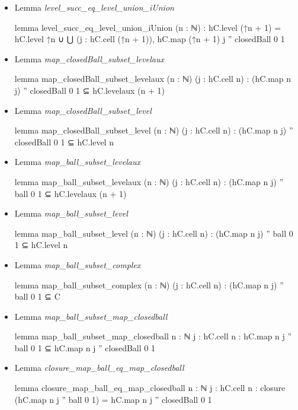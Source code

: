 \documentclass[colorinlistoftodos]{article}
\begin{document}
\begin{itemize}
\begin{leancode}
\end{leancode}
  \item Lemma \emph{level\_succ\_eq\_level\_union\_iUnion}
\begin{leancode}
lemma level_succ_eq_level_union_iUnion (n : ℕ) : 
  hC.level (↑n + 1) = 
  hC.level ↑n ∪ ⋃ (j : hC.cell (↑n + 1)), hC.map (↑n + 1) j '' closedBall 0 1
\end{leancode}
  \item Lemma \emph{map\_closedBall\_subset\_levelaux}
\begin{leancode}
lemma map_closedBall_subset_levelaux (n : ℕ) (j : hC.cell n) : 
  (hC.map n j) '' closedBall 0 1 ⊆ hC.levelaux (n + 1)
\end{leancode}
  \item Lemma \emph{map\_closedBall\_subset\_level}
\begin{leancode}
lemma map_closedBall_subset_level (n : ℕ) (j : hC.cell n) : 
  (hC.map n j) '' closedBall 0 1 ⊆ hC.level n
\end{leancode}
  \item Lemma \emph{map\_ball\_subset\_levelaux}
\begin{leancode}
lemma map_ball_subset_levelaux (n : ℕ) (j : hC.cell n) : 
  (hC.map n j) '' ball 0 1 ⊆ hC.levelaux (n + 1)
\end{leancode}
  \item Lemma \emph{map\_ball\_subset\_level}
\begin{leancode}
lemma map_ball_subset_level (n : ℕ) (j : hC.cell n) : 
  (hC.map n j) '' ball 0 1 ⊆ hC.level n
\end{leancode}
  \item Lemma \emph{map\_ball\_subset\_complex}
\begin{leancode}
lemma map_ball_subset_complex (n : ℕ) (j : hC.cell n) : 
  (hC.map n j) '' ball 0 1 ⊆ C
\end{leancode}
  \item Lemma \emph{map\_ball\_subset\_map\_closedball}
\begin{leancode}
lemma map_ball_subset_map_closedball {n : ℕ} {j : hC.cell n} :
  hC.map n j '' ball 0 1 ⊆ hC.map n j '' closedBall 0 1
\end{leancode}
  \item Lemma \emph{closure\_map\_ball\_eq\_map\_closedball}
\begin{leancode}
lemma closure_map_ball_eq_map_closedball {n : ℕ} {j : hC.cell n} : 
  closure (hC.map n j '' ball 0 1) = hC.map n j '' closedBall 0 1
\end{leancode}

\end{itemize}
\end{document}
